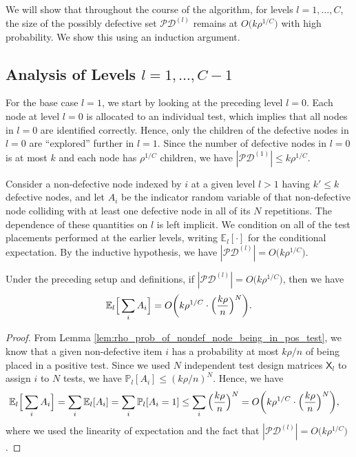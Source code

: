 We will show that throughout the course of the algorithm, for levels $l=1,\dots,C$, the size of the possibly defective set $\mathcal{PD}^{(l)}$ remains at $O\big(k\rho^{1/C}\big)$ with high probability.  We show this using an induction argument.  

\subsection{Analysis of Levels $l=1,\dots,C-1$}

For the base case $l=1$, we start by looking at the preceding level $l=0$. Each node at level $l=0$ is allocated to an individual test, which implies that all nodes in $l=0$ are identified correctly. Hence, only the children of the defective nodes in $l=0$ are ``explored'' further in $l=1$. Since the number of defective nodes in $l=0$ is at most $k$ and each node has $\rho^{1/C}$ children, we have $|\mathcal{PD}^{(1)}|\leq k\rho^{1/C}$. 

Consider a non-defective node indexed by $i$ at a given level $l > 1$ having $k'\leq k$ defective nodes, and let $A_i$ be the indicator random variable of that non-defective node colliding with at least one defective node in all of its $N$ repetitions. The dependence of these quantities on $l$ is left implicit. We condition on all of the test placements performed at the earlier levels, writing $\mathbb{E}_l[\cdot]$ for the conditional expectation. By the inductive hypothesis, we have $|\mathcal{PD}^{(l)}|=O\big(k\rho^{1/C}\big)$.

\begin{lemma} \label{lem:average_bound_rho_case}
Under the preceding setup and definitions, if $|\mathcal{PD}^{(l)}|=O\big(k\rho^{1/C}\big)$, then we have
\begin{align}
    \mathbb{E}_l\Big[\sum_iA_i\Big]=O\bigg(k\rho^{1/C}\cdot\Big(\frac{k\rho}{n}\Big)^{N}\bigg).
\end{align}
\end{lemma}

\begin{proof}
From Lemma \ref{lem:rho_prob_of_nondef_node_being_in_pos_test}, we know that a given non-defective item $i$ has a probability at most $k\rho/n$ of being placed in a positive test. Since we used $N$ independent test design matrices $\mathsf{X}_l$ to assign $i$ to $N$ tests, we have $\mathbb{P}_l[A_i]\leq(k\rho/n)^{N}$. Hence, we have
\begin{align}
    \mathbb{E}_l\Big[\sum_iA_i\Big]
    &=\sum_i\mathbb{E}_l[A_i]
    =\sum_i\mathbb{P}_l[A_i = 1]
    \leq\sum_i\Big(\frac{k\rho}{n}\Big)^{N}
    =O\bigg(k\rho^{1/C}\cdot\Big(\frac{k\rho}{n}\Big)^{N}\bigg),
\end{align}
where we used the linearity of expectation and the fact that $|\mathcal{PD}^{(l)}|=O\big(k\rho^{1/C}\big)$.
\end{proof}

